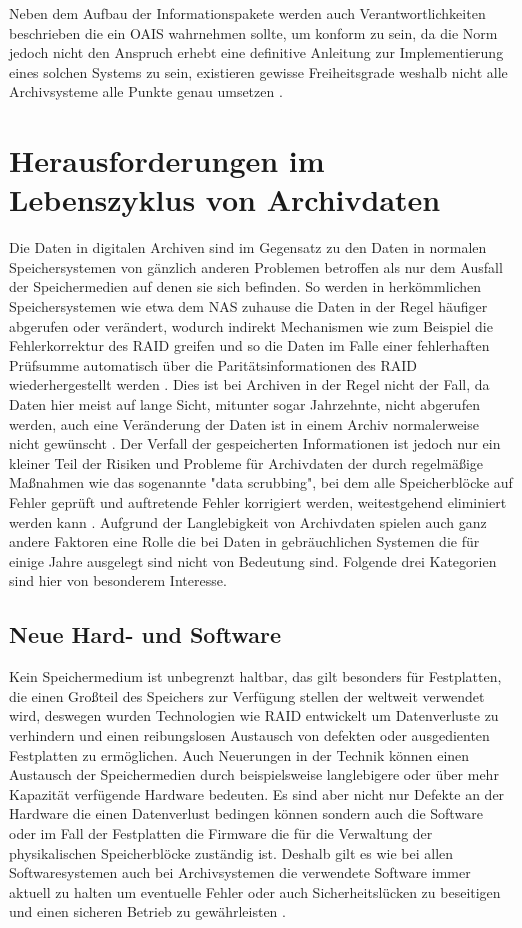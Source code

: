 \documentclass[conference,compsoc,final,a4paper]{IEEEtran}
\begin{document}
Neben dem Aufbau der Informationspakete werden auch Verantwortlichkeiten beschrieben die ein \ac{OAIS} wahrnehmen sollte, um konform zu sein, da die Norm jedoch nicht den Anspruch erhebt eine definitive Anleitung zur Implementierung eines solchen Systems zu sein, existieren gewisse Freiheitsgrade weshalb nicht alle Archivsysteme alle Punkte genau umsetzen \autocite{Ball2006}.

\section{Herausforderungen im Lebenszyklus von Archivdaten}
Die Daten in digitalen Archiven sind im Gegensatz zu den Daten in normalen Speichersystemen von gänzlich anderen Problemen betroffen als nur dem Ausfall der Speichermedien auf denen sie sich befinden. So werden in herkömmlichen Speichersystemen wie etwa dem \ac{NAS} zuhause die Daten in der Regel häufiger abgerufen oder verändert, wodurch indirekt Mechanismen wie zum Beispiel die Fehlerkorrektur des \ac{RAID} greifen und so die Daten im Falle einer fehlerhaften Prüfsumme automatisch über die Paritätsinformationen des \ac{RAID} wiederhergestellt werden \autocite{Lakshmi2008}. Dies ist bei Archiven in der Regel nicht der Fall, da Daten hier meist auf lange Sicht, mitunter sogar Jahrzehnte, nicht abgerufen werden, auch eine Veränderung der Daten ist in einem Archiv normalerweise nicht gewünscht . Der Verfall der gespeicherten Informationen ist jedoch nur ein kleiner Teil der Risiken und Probleme für Archivdaten der durch regelmäßige Maßnahmen wie das sogenannte "data scrubbing", bei dem alle Speicherblöcke auf Fehler geprüft und auftretende Fehler korrigiert werden, weitestgehend eliminiert werden kann \autocite{Lakshmi2008}. Aufgrund der Langlebigkeit von Archivdaten spielen auch ganz andere Faktoren eine Rolle die bei Daten in gebräuchlichen Systemen die für einige Jahre ausgelegt sind nicht von Bedeutung sind. Folgende drei Kategorien sind hier von besonderem Interesse.

\subsection{Neue Hard- und Software}
Kein Speichermedium ist unbegrenzt haltbar, das gilt besonders für Festplatten, die einen Großteil des Speichers zur Verfügung stellen der weltweit verwendet wird, deswegen wurden Technologien wie \ac{RAID} entwickelt um Datenverluste zu verhindern und einen reibungslosen Austausch von defekten oder ausgedienten Festplatten zu ermöglichen. Auch Neuerungen in der Technik können einen Austausch der Speichermedien durch beispielsweise langlebigere oder über mehr Kapazität verfügende Hardware bedeuten. Es sind aber nicht nur Defekte an der Hardware die einen Datenverlust bedingen können sondern auch die Software oder im Fall der Festplatten die Firmware die für die Verwaltung der physikalischen Speicherblöcke zuständig ist. Deshalb gilt es wie bei allen Softwaresystemen auch bei Archivsystemen die verwendete Software immer aktuell zu halten um eventuelle Fehler oder auch Sicherheitslücken zu beseitigen und einen sicheren Betrieb zu gewährleisten \autocite{Lakshmi2008}.
\end{document}
